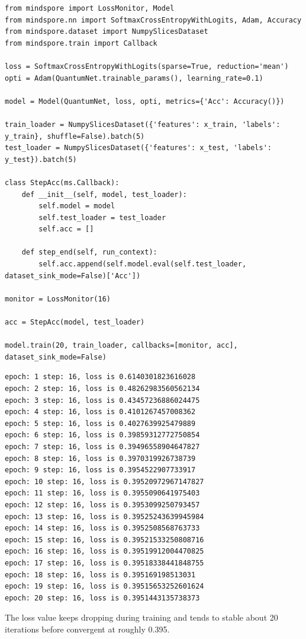 \begin{lstlisting}
from mindspore import LossMonitor, Model
from mindspore.nn import SoftmaxCrossEntropyWithLogits, Adam, Accuracy
from mindspore.dataset import NumpySlicesDataset
from mindspore.train import Callback

loss = SoftmaxCrossEntropyWithLogits(sparse=True, reduction='mean')
opti = Adam(QuantumNet.trainable_params(), learning_rate=0.1)

model = Model(QuantumNet, loss, opti, metrics={'Acc': Accuracy()})

train_loader = NumpySlicesDataset({'features': x_train, 'labels': y_train}, shuffle=False).batch(5)
test_loader = NumpySlicesDataset({'features': x_test, 'labels': y_test}).batch(5)

class StepAcc(ms.Callback):
    def __init__(self, model, test_loader):
        self.model = model
        self.test_loader = test_loader
        self.acc = []

    def step_end(self, run_context):
        self.acc.append(self.model.eval(self.test_loader, dataset_sink_mode=False)['Acc'])

monitor = LossMonitor(16)

acc = StepAcc(model, test_loader)

model.train(20, train_loader, callbacks=[monitor, acc], dataset_sink_mode=False)
\end{lstlisting}

\begin{lstlisting}
epoch: 1 step: 16, loss is 0.6140301823616028
epoch: 2 step: 16, loss is 0.48262983560562134
epoch: 3 step: 16, loss is 0.43457236886024475
epoch: 4 step: 16, loss is 0.4101267457008362
epoch: 5 step: 16, loss is 0.4027639925479889
epoch: 6 step: 16, loss is 0.39859312772750854
epoch: 7 step: 16, loss is 0.39496558904647827
epoch: 8 step: 16, loss is 0.3970319926738739
epoch: 9 step: 16, loss is 0.3954522907733917
epoch: 10 step: 16, loss is 0.39520972967147827
epoch: 11 step: 16, loss is 0.3955090641975403
epoch: 12 step: 16, loss is 0.3953099250793457
epoch: 13 step: 16, loss is 0.39525243639945984
epoch: 14 step: 16, loss is 0.3952508568763733
epoch: 15 step: 16, loss is 0.39521533250808716
epoch: 16 step: 16, loss is 0.39519912004470825
epoch: 17 step: 16, loss is 0.39518338441848755
epoch: 18 step: 16, loss is 0.395169198513031
epoch: 19 step: 16, loss is 0.39515653252601624
epoch: 20 step: 16, loss is 0.3951443135738373
\end{lstlisting}

The loss value keeps dropping during training and tends to stable about 20 iterations before convergent at roughly 0.395.

